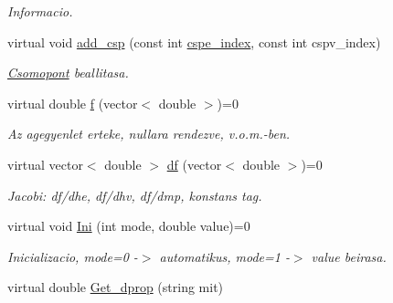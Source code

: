 \begin{DoxyCompactItemize}
\begin{DoxyCompactList}\small\item\em Informacio. \end{DoxyCompactList}\item 
virtual void \hyperlink{class_agelem_aa440ca95f0c0d27092f048f0c95cd998}{add\+\_\+csp} (const int \hyperlink{class_agelem_a9639c0a7a0165b644d62033e24eb6d24}{cspe\+\_\+index}, const int cspv\+\_\+index)\hypertarget{class_agelem_aa440ca95f0c0d27092f048f0c95cd998}{}\label{class_agelem_aa440ca95f0c0d27092f048f0c95cd998}

\begin{DoxyCompactList}\small\item\em \hyperlink{class_csomopont}{Csomopont} beallitasa. \end{DoxyCompactList}\item 
virtual double \hyperlink{class_agelem_aa1d93be52ddae11df003c4e35c47084b}{f} (vector$<$ double $>$)=0\hypertarget{class_agelem_aa1d93be52ddae11df003c4e35c47084b}{}\label{class_agelem_aa1d93be52ddae11df003c4e35c47084b}

\begin{DoxyCompactList}\small\item\em Az agegyenlet erteke, nullara rendezve, v.\+o.\+m.-\/ben. \end{DoxyCompactList}\item 
virtual vector$<$ double $>$ \hyperlink{class_agelem_a7934ea6320bdc37526ed3daa108ce1ed}{df} (vector$<$ double $>$)=0\hypertarget{class_agelem_a7934ea6320bdc37526ed3daa108ce1ed}{}\label{class_agelem_a7934ea6320bdc37526ed3daa108ce1ed}

\begin{DoxyCompactList}\small\item\em Jacobi\+: df/dhe, df/dhv, df/dmp, konstans tag. \end{DoxyCompactList}\item 
virtual void \hyperlink{class_agelem_a844171faf01143770bbd894b1a48e72f}{Ini} (int mode, double value)=0\hypertarget{class_agelem_a844171faf01143770bbd894b1a48e72f}{}\label{class_agelem_a844171faf01143770bbd894b1a48e72f}

\begin{DoxyCompactList}\small\item\em Inicializacio, mode=0 -\/$>$ automatikus, mode=1 -\/$>$ value beirasa. \end{DoxyCompactList}\item 
virtual double \hyperlink{class_agelem_ab808a928d9ebef901155b6b985370eb5}{Get\+\_\+dprop} (string mit)\hypertarget{class_agelem_ab808a928d9ebef901155b6b985370eb5}{}\label{class_agelem_ab808a928d9ebef901155b6b985370eb5}


\end{DoxyCompactItemize}
